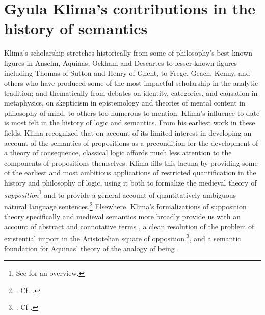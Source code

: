 \documentclass[]{article}
\begin{document}
\section{Gyula Klima's contributions in the history of semantics}
Klima's scholarship stretches 
historically from some of philosophy's best-known figures in Anselm, Aquinas, Ockham and Descartes 
to lesser-known figures including Thomas of Sutton and Henry of Ghent, 
to Frege, Geach, Kenny, and others who have produced some of the most impactful scholarship in the analytic tradition; 
and 
thematically from debates 
on identity, categories, and causation in metaphysics, 
on skepticism in epistemology and theories of mental content in philosophy of mind, 
to others too numerous to mention. 
Klima's influence to date is most felt 
in the history of logic and semantics.
From his earliest work in these fields, 
Klima recognized 
that 
on account of its 
limited interest in developing an account of the semantics of propositions as a precondition for the development of a theory of consequence, 
classical logic affords much less attention to the components of propositions themselves. 
Klima fills this lacuna by providing some of the earliest and most ambitious applications of restricted quantification in the history and philosophy of logic, 
using it both to formalize the medieval theory of  \emph{supposition}\footnote{See  \autocite{sep-medieval-terms} for an overview.} 
and to provide a general account of quantitatively ambiguous natural language sentences.\footnote{\autocite{Klima1988,Klima1990,KlimaSandu1990,Klima1991b}. Cf. \autocite{Parsons2014}.} 
Elsewhere, 
Klima's formalizations of supposition theory specifically 
and medieval semantics more broadly 
provide us with an account of abstract and connotative terms \autocite{Klima1991}, 
a clean resolution of the problem of existential import in the Aristotelian square of opposition.\footnote{\autocite{Klima2001}. Cf \autocite{Read2015b}.}, 
and a semantic foundation for Aquinas' theory of the analogy of being \autocite{Klima1996,Klima2002}.
\end{document}
